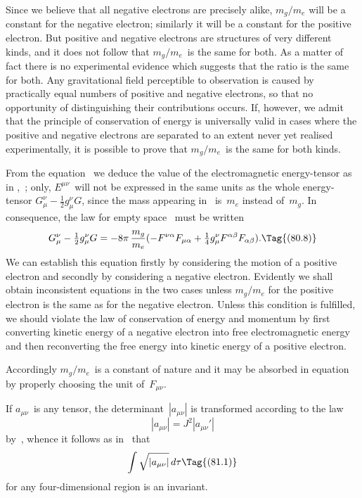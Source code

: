 \documentclass[12pt]{book}
\begin{document}
Since we believe that all negative electrons are precisely alike, $m_{g}/m_{e}$ will
be a constant for the negative electron; similarly it will be a constant for the
positive electron. But positive and negative electrons are structures of very
different kinds, and it does not follow that $m_{g}/m_{e}$~is the same for both. As a
matter of fact there is no experimental evidence which suggests that the ratio
is the same for both. Any gravitational field perceptible to observation is
caused by practically equal numbers of positive and negative electrons, so that
no opportunity of distinguishing their contributions occurs. If, however, we
admit that the principle of conservation of energy is universally valid in cases
where the positive and negative electrons are separated to an extent never
yet realised experimentally, it is possible to prove that $m_{g}/m_{e}$~is the same for
both kinds.

From the equation~ we deduce the value of the electromagnetic
energy\hyp{}tensor as in ,~; only, $E^{\mu\nu}$~will not be expressed in the same
units as the whole energy\hyp{}tensor $G_{\mu}^{\nu} - \frac{1}{2} g_{\mu}^{\nu} G$, since the mass appearing in~
is~$m_{e}$ instead of~$m_{g}$. In consequence, the law for empty space~ must be
written
\[
G_{\mu}^{\nu} - \tfrac{1}{2} g_{\mu}^{\nu} G
= -8\pi\, \frac{m_{g}}{m_{e}} (-F^{\nu\alpha} F_{\mu\alpha} + \tfrac{1}{4}g_{\mu}^{\nu} F^{\alpha\beta} F_{\alpha\beta}).
\Tag{(80.8)}
\]
We can establish this equation firstly by considering the motion of a positive
electron and secondly by considering a negative electron. Evidently we shall
obtain inconsistent equations in the two cases unless $m_{g}/m_{e}$ for the positive
electron is the same as for the negative electron. Unless this condition is fulfilled,
we should violate the law of conservation of energy and momentum by
first converting kinetic energy of a negative electron into free electromagnetic
energy and then reconverting the free energy into kinetic energy of a positive
electron.

Accordingly $m_{g}/m_{e}$~is a constant of nature and it may be absorbed in
equation~ by properly choosing the unit of~$F_{\mu\nu}$.


If $a_{\mu\nu}$~is any tensor, the determinant~$|a_{\mu\nu}|$ is transformed according to the
law
\[
|a_{\mu\nu}| = J^{2} |a_{\mu\nu}'|
\]
by~, whence it follows as in~ that
\[
\int \sqrt{|a_{\mu\nu}|}\, d\tau
\Tag{(81.1)}
\]
for any four\hyp{}dimensional region is an invariant.
\end{document}
